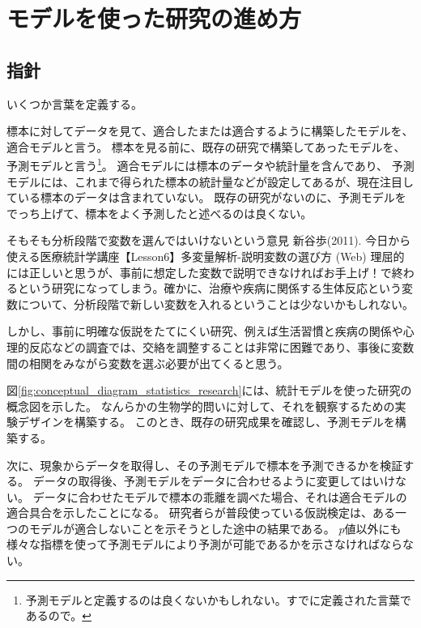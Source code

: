 \chapter{モデルを使った研究の進め方}

\section{指針}
いくつか言葉を定義する。
\begin{defi}
    標本に対してデータを見て、適合したまたは適合するように構築したモデルを、適合モデルと言う。
    標本を見る前に、既存の研究で構築してあったモデルを、予測モデルと言う\footnote{予測モデルと定義するのは良くないかもしれない。すでに定義された言葉であるので。}。
    適合モデルには標本のデータや統計量を含んであり、
    予測モデルには、これまで得られた標本の統計量などが設定してあるが、現在注目している標本のデータは含まれていない。
    既存の研究がないのに、予測モデルをでっち上げて、標本をよく予測したと述べるのは良くない。
\end{defi}

そもそも分析段階で変数を選んではいけないという意見
新谷歩(2011). 今日から使える医療統計学講座【Lesson6】多変量解析-説明変数の選び方 (Web)
理屈的には正しいと思うが、事前に想定した変数で説明できなければお手上げ！で終わるという研究になってしまう。確かに、治療や疾病に関係する生体反応という変数について、分析段階で新しい変数を入れるということは少ないかもしれない。

しかし、事前に明確な仮説をたてにくい研究、例えば生活習慣と疾病の関係や心理的反応などの調査では、交絡を調整することは非常に困難であり、事後に変数間の相関をみながら変数を選ぶ必要が出てくると思う。
\fi


図\ref{fig:conceptual_diagram_statistics_research}には、統計モデルを使った研究の概念図を示した。
なんらかの生物学的問いに対して、それを観察するための実験デザインを構築する。
このとき、既存の研究成果を確認し、予測モデルを構築する。

次に、現象からデータを取得し、その予測モデルで標本を予測できるかを検証する。
データの取得後、予測モデルをデータに合わせるように変更してはいけない。
データに合わせたモデルで標本の乖離を調べた場合、それは適合モデルの適合具合を示したことになる。
研究者らが普段使っている仮説検定は、ある一つのモデルが適合しないことを示そうとした途中の結果である。
$p$値以外にも様々な指標を使って予測モデルにより予測が可能であるかを示さなければならない。

